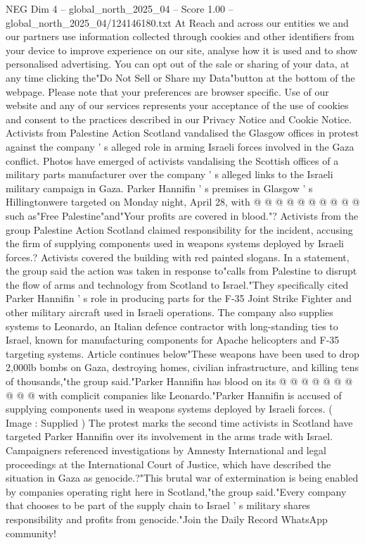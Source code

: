 \begin{textsample}{NEG Dim 4 – global\_north\_2025\_04 – Score 1.00 – global\_north\_2025\_04/124146180.txt}  \label{ex:f4_neg_234}
At Reach and across our entities we and our partners use information collected through cookies and other identifiers from your device to improve experience on our site, analyse how it is used and to show personalised advertising.
You can opt out of the sale or sharing of your data, at any time clicking the"Do Not Sell or Share my Data"button at the bottom of the webpage.
Please note that your preferences are browser specific.
Use of our website and any of our services represents your acceptance of the use of cookies and consent to the practices described in our Privacy Notice and Cookie Notice.
Activists from Palestine Action Scotland vandalised the Glasgow offices in protest against the company ' s alleged role in arming Israeli forces involved in the Gaza conflict.
Photos have emerged of activists vandalising the Scottish offices of a military parts manufacturer over the company ' s alleged links to the Israeli military campaign in Gaza.
Parker Hannifin ' s premises in Glasgow ' s Hillingtonwere targeted on Monday night, April 28, with @ @ @ @ @ @ @ @ @ @ such as"Free Palestine"and"Your profits are covered in blood."?
Activists from the group Palestine Action Scotland claimed responsibility for the incident, accusing the firm of supplying components used in weapons systems deployed by Israeli forces.?
Activists covered the building with red painted slogans.
In a statement, the group said the action was taken in response to"calls from Palestine to disrupt the flow of arms and technology from Scotland to Israel."They specifically cited Parker Hannifin ' s role in producing parts for the F-35 Joint Strike Fighter and other military aircraft used in Israeli operations.
The company also supplies systems to Leonardo, an Italian defence contractor with long-standing ties to Israel, known for manufacturing components for Apache helicopters and F-35 targeting systems.
Article continues below"These weapons have been used to drop 2,000lb bombs on Gaza, destroying homes, civilian infrastructure, and killing tens of thousands,"the group said."Parker Hannifin has blood on its @ @ @ @ @ @ @ @ @ @ with complicit companies like Leonardo."Parker Hannifin is accused of supplying components used in weapons systems deployed by Israeli forces. ( Image : Supplied ) The protest marks the second time activists in Scotland have targeted Parker Hannifin over its involvement in the arms trade with Israel.
Campaigners referenced investigations by Amnesty International and legal proceedings at the International Court of Justice, which have described the situation in Gaza as genocide.?"This brutal war of extermination is being enabled by companies operating right here in Scotland,"the group said."Every company that chooses to be part of the supply chain to Israel ' s military shares responsibility and profits from genocide."Join the Daily Record WhatsApp community!

\end{textsample}
